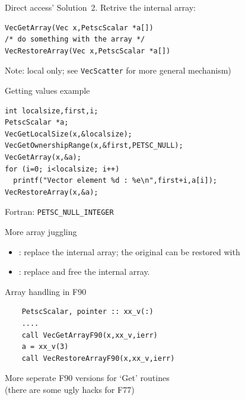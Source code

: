 \begin{longstory}
\begin{details}
\begin{numberedframe}{Direct access'}
  Solution~2.
  Retrive the internal array:
\begin{lstlisting}
VecGetArray(Vec x,PetscScalar *a[])
/* do something with the array */
VecRestoreArray(Vec x,PetscScalar *a[])
\end{lstlisting}
Note: local only; see \lstinline{VecScatter} for more general
mechanism)
\end{numberedframe}

\begin{numberedframe}{Getting values example}
\begin{lstlisting}
int localsize,first,i;
PetscScalar *a;
VecGetLocalSize(x,&localsize);
VecGetOwnershipRange(x,&first,PETSC_NULL);
VecGetArray(x,&a);
for (i=0; i<localsize; i++)
  printf("Vector element %d : %e\n",first+i,a[i]);
VecRestoreArray(x,&a);
\end{lstlisting}
Fortran: \lstinline{PETSC_NULL_INTEGER}
\end{numberedframe}

\begin{numberedframe}{More array juggling}
  \begin{itemize}
  \item
    : replace the internal array;
    the original can be restored with 
  \item {}: replace and free the internal array.
  \end{itemize}
\end{numberedframe}

\lstset{language=Fortran}
\begin{fortran}
\begin{numberedframe}{Array handling in F90}
\begin{lstlisting}
    PetscScalar, pointer :: xx_v(:)
    ....
    call VecGetArrayF90(x,xx_v,ierr)
    a = xx_v(3)
    call VecRestoreArrayF90(x,xx_v,ierr)
\end{lstlisting}
More seperate F90 versions for `Get' routines\\
(there are some ugly hacks for F77)
\end{numberedframe}
\end{fortran}

\end{details}
\lstset{language=C}

\end{longstory}
